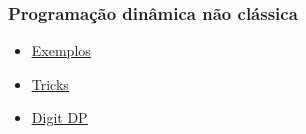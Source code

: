 \documentclass{beamer}
\begin{document}
	\begin{frame}
	\frametitle{Programação dinâmica não clássica}
	\begin{itemize}
	\item \textcolor{black}{\underline{\href{https://www.iarcs.org.in/inoi/online-study-material/topics/dp.php}{Exemplos}}}
	\item \textcolor{black}{\underline{\href{https://codeforces.com/blog/entry/47764}{Tricks}}}
	\item \textcolor{black}{\underline{\href{https://codeforces.com/blog/entry/53960}{Digit DP}}}
	\end{itemize}
	\end{frame}
\end{document}
